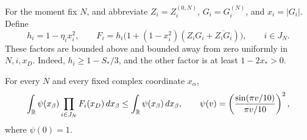 For the moment fix \(N\), and abbreviate
\(Z_i=Z_i^{(0,N)}\), \(G_i=G_i^{(N)}\), and \(x_i=|G_i|\). Define
\begin{equation}
 h_i=1-\eta_i x_i^2,\qquad
 F_i=h_i\bigl(1+(1-x_i^2)(Z_iG_i+\overline{Z_iG_i})\bigr),
 \qquad i\in J_N.
 \label{np:factors}
\end{equation}
These factors are bounded above and bounded away from zero uniformly in
\(N,i,x_D\). Indeed, \(h_i\ge1-S_*/3\), and the other factor is at
least \(1-2x_*>0\).

\begin{proposition}\label{np:integral}
For every \(N\) and every fixed complex coordinate \(x_\alpha\),
\begin{equation}
 \int_\mathbb R\psi(x_\beta)\prod_{i\in J_N}F_i(x_D)\,dx_\beta
 \le\int_\mathbb R\psi(x_\beta)\,dx_\beta,
 \qquad
 \psi(v)=\left(\frac{\sin(\pi v/10)}{\pi v/10}\right)^2,
 \label{np:integral-bound}
\end{equation}
where \(\psi(0)=1\).
\end{proposition}

